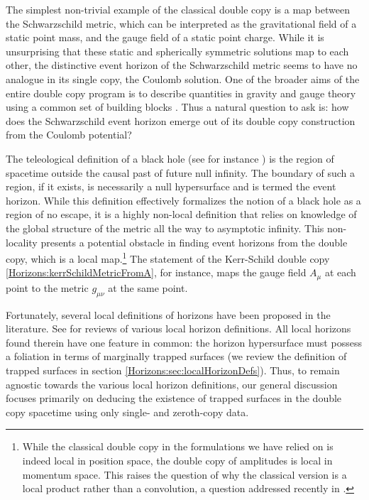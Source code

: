The simplest non-trivial example of the classical double copy is a map between the Schwarzschild metric, which can
be interpreted as the gravitational field of a static point mass, and
the gauge field of a static point charge. While it is unsurprising that these static and spherically symmetric
solutions map to each other, the distinctive event horizon of the Schwarzschild
metric seems to have no analogue in its single copy, the Coulomb solution. One of the broader aims of the entire
double copy program is to describe quantities in gravity and gauge theory using a common set of building blocks
\cite{Bern:2019prr}. Thus a natural question to ask is: how does the Schwarzschild event horizon emerge out of its
double copy construction from the Coulomb potential?

The teleological definition of a black hole (see for instance \cite{Hawking:1973uf}) is the
region of spacetime outside the causal past of future null infinity. The boundary of such a region, if it exists,
is necessarily a null hypersurface and is termed the event horizon. While this definition effectively formalizes
the notion of a black hole as a region of no escape, it is a highly non-local definition that relies on knowledge
of the global structure of the metric all the way to asymptotic infinity. This non-locality presents a potential
obstacle in finding event horizons from the double copy, which is a local map.\footnote{While the classical double copy in the formulations we have relied on is indeed local in position space, the double copy of amplitudes is local in momentum space. This raises the question of why the classical version is a local product rather than a convolution, a question addressed recently in \cite{Monteiro:2021ztt, Luna:2022dxo}.} The statement of the Kerr-Schild
double copy \eqref{Horizons:kerrSchildMetricFromA}, for instance, maps the gauge field $A_{\mu}$ at each point to the metric
$g_{\mu \nu}$ at the same point.

Fortunately, several local definitions of horizons have been proposed in the literature. See
\cite{Gourgoulhon:2008pu,Ashtekar:2004cn,Booth:2005qc,Senovilla:2011fk} for reviews of various local horizon
definitions. All local horizons found therein have one feature in common: the horizon hypersurface must possess a
foliation in terms of marginally trapped surfaces (we review the definition of trapped surfaces in section
\ref{Horizons:sec:localHorizonDefs}). Thus, to remain agnostic towards the various local horizon definitions, our general
discussion focuses primarily on deducing the existence of trapped surfaces in the double copy spacetime using only
single- and zeroth-copy data. 

